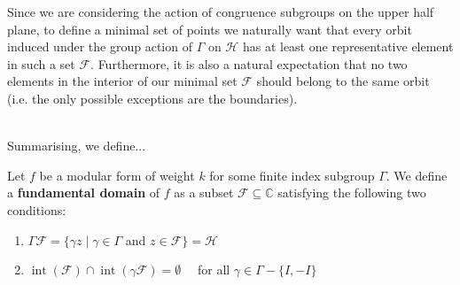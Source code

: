 Since we are considering the action of congruence subgroups on the upper half plane, to define a minimal set of points we naturally want that every orbit induced under the group action of $\Gamma$ on $\mathcal{H}$ has at least one representative element in such a set $\mathcal{F}$. Furthermore, it is also a natural expectation that no two elements in the interior of our minimal set $\mathcal{F}$ should belong to the same orbit (i.e. the only possible exceptions are the boundaries).

\\
Summarising, we define...

\begin{definition}
Let $f$ be a modular form of weight $k$ for some finite index subgroup $\Gamma$. We define a \textbf{fundamental domain} of $f$ as a subset $\mathcal{F} \subseteq \mathbb{C}$ satisfying the following two conditions: \\

 \begin{enumerate}
  \item $\Gamma \mathcal{F}=\{\gamma z \mid \gamma \in \Gamma$ and $z \in \mathcal{F}\}=\mathcal{H}$

  \item $\operatorname{int}(\mathcal{F}) \cap \operatorname{int}(\gamma \mathcal{F})=\emptyset \quad$ for all $\gamma \in \Gamma-\{I,-I\}$

\end{enumerate}

\end{definition}

